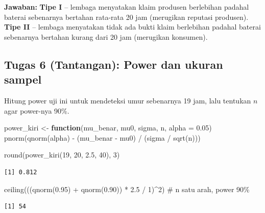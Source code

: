 \documentclass[
  indonesian,
  letterpaper,
]{book}
\newenvironment{Shaded}{\begin{snugshade}}{\end{snugshade}}
\newcommand{\AttributeTok}[1]{\textcolor[rgb]{0.40,0.45,0.13}{#1}}
\newcommand{\CommentTok}[1]{\textcolor[rgb]{0.37,0.37,0.37}{#1}}
\newcommand{\ControlFlowTok}[1]{\textcolor[rgb]{0.00,0.23,0.31}{\textbf{#1}}}
\newcommand{\DecValTok}[1]{\textcolor[rgb]{0.68,0.00,0.00}{#1}}
\newcommand{\FloatTok}[1]{\textcolor[rgb]{0.68,0.00,0.00}{#1}}
\newcommand{\FunctionTok}[1]{\textcolor[rgb]{0.28,0.35,0.67}{#1}}
\newcommand{\NormalTok}[1]{\textcolor[rgb]{0.00,0.23,0.31}{#1}}
\newcommand{\OtherTok}[1]{\textcolor[rgb]{0.00,0.23,0.31}{#1}}
\newcommand{\SpecialCharTok}[1]{\textcolor[rgb]{0.37,0.37,0.37}{#1}}
\begin{document}
\textbf{Jawaban:} \textbf{Tipe I} -- lembaga menyatakan klaim produsen
berlebihan padahal baterai sebenarnya bertahan rata-rata 20 jam
(merugikan reputasi produsen). \textbf{Tipe II} -- lembaga menyatakan
tidak ada bukti klaim berlebihan padahal baterai sebenarnya bertahan
kurang dari 20 jam (merugikan konsumen).

\subsection{Tugas 6 (Tantangan): Power dan ukuran
sampel}\label{tugas-6-tantangan-power-dan-ukuran-sampel}

Hitung power uji ini untuk mendeteksi umur sebenarnya 19 jam, lalu
tentukan \(n\) agar power-nya 90\%.

\begin{Shaded}
\begin{Highlighting}[]
\NormalTok{power\_kiri }\OtherTok{\textless{}{-}} \ControlFlowTok{function}\NormalTok{(mu\_benar, mu0, sigma, n, }\AttributeTok{alpha =} \FloatTok{0.05}\NormalTok{)}
  \FunctionTok{pnorm}\NormalTok{(}\FunctionTok{qnorm}\NormalTok{(alpha) }\SpecialCharTok{{-}}\NormalTok{ (mu\_benar }\SpecialCharTok{{-}}\NormalTok{ mu0) }\SpecialCharTok{/}\NormalTok{ (sigma }\SpecialCharTok{/} \FunctionTok{sqrt}\NormalTok{(n)))}

\FunctionTok{round}\NormalTok{(}\FunctionTok{power\_kiri}\NormalTok{(}\DecValTok{19}\NormalTok{, }\DecValTok{20}\NormalTok{, }\FloatTok{2.5}\NormalTok{, }\DecValTok{40}\NormalTok{), }\DecValTok{3}\NormalTok{)}
\end{Highlighting}
\end{Shaded}

\begin{verbatim}
[1] 0.812
\end{verbatim}

\begin{Shaded}
\begin{Highlighting}[]
\FunctionTok{ceiling}\NormalTok{(((}\FunctionTok{qnorm}\NormalTok{(}\FloatTok{0.95}\NormalTok{) }\SpecialCharTok{+} \FunctionTok{qnorm}\NormalTok{(}\FloatTok{0.90}\NormalTok{)) }\SpecialCharTok{*} \FloatTok{2.5} \SpecialCharTok{/} \DecValTok{1}\NormalTok{)}\SpecialCharTok{\^{}}\DecValTok{2}\NormalTok{)   }\CommentTok{\# n satu arah, power 90\%}
\end{Highlighting}
\end{Shaded}

\begin{verbatim}
[1] 54
\end{verbatim}
\end{document}
